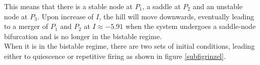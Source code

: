 \documentclass[12pt,a4paper]{article}
\begin{document}
This means that there is a stable node at $P_1$, a saddle at $P_2$ and an unstable node at $P_3$. Upon increase of $I$, the hill will move downwards, eventually leading to a merger of $P_1$ and $P_2$ at $I\approx -5.91$ when the system undergoes a saddle-node bifurcation and is no longer in the bistable regime.\\
When it is in the bistable regime, there are two sets of initial conditions, leading either to quiescence or repetitive firing as shown in figure \ref{subfigrinzel}.
\begin{figure}[H]

\end{figure}
\end{document}
